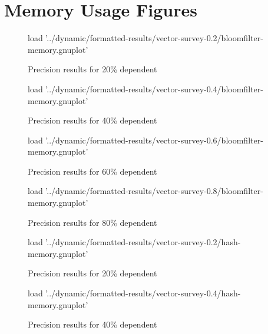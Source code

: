 \chapter{Memory Usage Figures} \label{chp:appndx:memory-figs}
\begin{figure}[H]
	\centering
	\begin{gnuplot}[terminal=pdf]
	load '../dynamic/formatted-results/vector-survey-0.2/bloomfilter-memory.gnuplot'
	\end{gnuplot}
	\caption{Precision results for 20\% dependent}
	\label{chart:memory-0.2-bloom}
\end{figure}


\begin{figure}[H]
	\centering
	\begin{gnuplot}[terminal=pdf]
	load '../dynamic/formatted-results/vector-survey-0.4/bloomfilter-memory.gnuplot'
	\end{gnuplot}
	\caption{Precision results for 40\% dependent}
	\label{chart:memory-0.4-bloom}
\end{figure}

\begin{figure}[H]
	\centering
	\begin{gnuplot}[terminal=pdf]
	load '../dynamic/formatted-results/vector-survey-0.6/bloomfilter-memory.gnuplot'
	\end{gnuplot}
	\caption{Precision results for 60\% dependent}
	\label{chart:memory-0.6-bloom}
\end{figure}

\begin{figure}[H]
	\centering
	\begin{gnuplot}[terminal=pdf]
	load '../dynamic/formatted-results/vector-survey-0.8/bloomfilter-memory.gnuplot'
	\end{gnuplot}
	\caption{Precision results for 80\% dependent}
	\label{chart:memory-0.8-bloom}
\end{figure}

\begin{figure}[H]
	\centering
	\begin{gnuplot}[terminal=pdf]
	load '../dynamic/formatted-results/vector-survey-0.2/hash-memory.gnuplot'
	\end{gnuplot}
	\caption{Precision results for 20\% dependent}
	\label{chart:memory-0.2-hash}
\end{figure}


\begin{figure}[H]
	\centering
	\begin{gnuplot}[terminal=pdf]
	load '../dynamic/formatted-results/vector-survey-0.4/hash-memory.gnuplot'
	\end{gnuplot}
	\caption{Precision results for 40\% dependent}
	\label{chart:memory-0.4-hash}
\end{figure}

